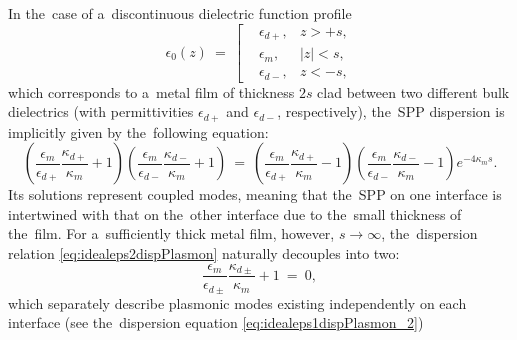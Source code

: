 In the~case of a~discontinuous dielectric function profile
\begin{equation}
\label{eq:idealeps2Plasmon}
\epsilon_0(z)~=~\left[
\begin{aligned}
&\epsilon_{d+}, &z>+s,\\
&\epsilon_m, &|z|<s, \\
&\epsilon_{d-}, &z<-s,
\end{aligned}
\right.
\end{equation}
which corresponds to a~metal film of thickness $2s$ clad between two different bulk dielectrics (with permittivities $\epsilon_{d+}$ and $\epsilon_{d-}$, respectively), the~SPP dispersion is implicitly given \cite{zayats} by the~following equation:
\begin{equation}
\label{eq:idealeps2dispPlasmon}
\left(\frac{\epsilon_m}{\epsilon_{d+}}\frac{\kappa_{d+}}{\kappa_m}+1\right)\left(\frac{\epsilon_m}{\epsilon_{d-}}\frac{\kappa_{d-}}{\kappa_m}+1\right)~=~\left(\frac{\epsilon_m}{\epsilon_{d+}}\frac{\kappa_{d+}}{\kappa_m}-1\right)\left(\frac{\epsilon_m}{\epsilon_{d-}}\frac{\kappa_{d-}}{\kappa_m}-1\right) e^{-4\kappa_m s}.
\end{equation}
Its solutions represent coupled modes, meaning that the~SPP on one interface is intertwined with that on the~other interface due to the~small thickness of the~film.
For a~sufficiently thick metal film, however, $s \rightarrow \infty$, the~dispersion relation \cref{eq:idealeps2dispPlasmon} naturally decouples into two:
\begin{equation}
\frac{\epsilon_m}{\epsilon_{d\pm}}\frac{\kappa_{d\pm}}{\kappa_m}+1~=~0,
\end{equation}
which separately describe plasmonic modes existing independently on each interface (see the~dispersion equation \cref{eq:idealeps1dispPlasmon_2})

